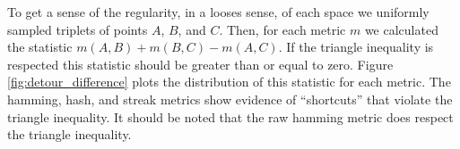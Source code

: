 



























To get a sense of the regularity, in a looses sense, of each space we uniformly sampled triplets of points $A$, $B$, and $C$.
Then, for each metric $m$ we calculated the statistic $m(A, B) + m(B, C) - m(A, C)$.
If the triangle inequality is respected this statistic should be greater than or equal to zero.
Figure \ref{fig:detour_difference} plots the distribution of this statistic for each metric.
The hamming, hash, and streak metrics show evidence of ``shortcuts'' that violate the triangle inequality.
It should be noted that the raw hamming metric does respect the triangle inequality.


